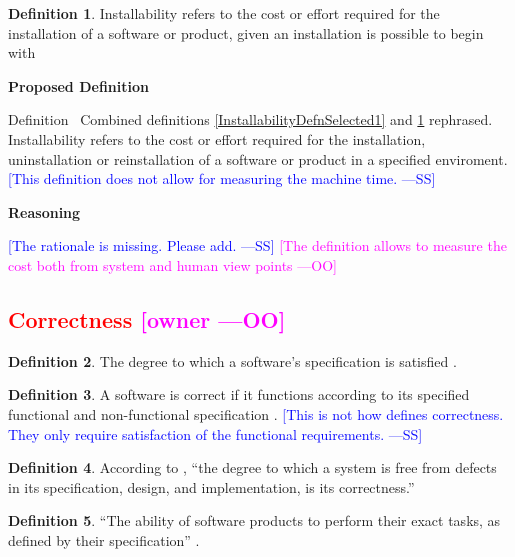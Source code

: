\documentclass[letterpaper,cleveref]{lipics-v2019}
\newcommand{\authornote}[3]{\textcolor{#1}{[#3 ---#2]}}
\newcommand{\authornote}[3]{}
\newcommand{\wss}[1]{\authornote{blue}{SS}{#1}} %
\newcommand{\oo}[1]{\authornote{magenta}{OO}{#1}} %
\newcommand{\notdone}[1]{\textcolor{red}{#1}}
\theoremstyle{definition}
\newtheorem{defn}{Definition}
\begin{document}
\begin{defn} \label{InstallabilityDefnSelected2}
	Installability refers to the cost or effort required for the installation of a
	software or product, given an installation is possible to begin with
	\citep{lenhard2013measuring}
\end{defn}

\noindent \textbf{Proposed Definition}

Definition~ Combined definitions \ref{InstallabilityDefnSelected1} and
\ref{InstallabilityDefnSelected2} rephrased.
Installability refers to the cost or effort required for the installation,
uninstallation or reinstallation of a software or product in a specified
enviroment.  \wss{This definition does not allow for
	measuring the machine time.}

\noindent \textbf{Reasoning}

\wss{The rationale is missing.  Please add.}
\oo{The definition allows to measure the cost both from system and human view
	points}

\subsection{\notdone{Correctness} \oo{owner}}

\begin{defn}
	The degree to which a software's specification is satisfied
	\citep{berander2005software}.
\end{defn}

\begin{defn} \label{CorrectDefnSelected} 
	A software is correct if it functions according to its specified functional
	and non-functional specification \citep{GhezziEtAl2003}.  \wss{This is not how
		\citet{GhezziEtAl2003} defines correctness.  They only require satisfaction
		of the functional requirements.}
	
\end{defn}

\begin{defn}
	According to \citet{wilson2009quality}, ``the degree to which a system is free
	from defects in its specification, design, and implementation, is its
	correctness.''
\end{defn}

\begin{defn}
	``The ability of software products to perform their exact tasks, as defined by
	their specification'' \citep{meyer1988object}.
\end{defn}
\end{document}
